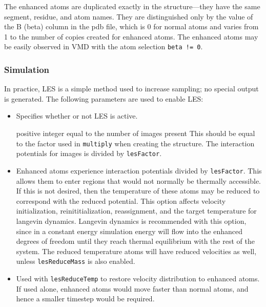The enhanced atoms are duplicated exactly in the structure---they have
the same segment, residue, and atom names.  They are distinguished only
by the value of the B (beta) column in the pdb file, which is 0 for
normal atoms and varies from 1 to the number of copies created for
enhanced atoms.  The enhanced atoms may be easily observed in VMD with
the atom selection \verb#beta != 0#.

\subsubsection{Simulation}

In practice, LES is a simple method used to increase sampling;
no special output is generated.
The following parameters are used to enable LES:

\begin{itemize}

\item
{}
{Specifies whether or not LES is active.}

{positive integer equal to the number of images present}
{This should be equal to the factor used in {\tt multiply}
 when creating the structure.  The interaction potentials for images is
 divided by {\tt lesFactor}.  
}

\item
{}
{Enhanced atoms experience interaction potentials divided by {\tt lesFactor}.
This allows them to enter regions that would not normally be thermally
accessible.  If this is not desired, then the temperature of these atoms
may be reduced to correspond with the reduced potential.  This option
affects velocity initialization, reinititialization, reassignment, and
the target temperature for langevin dynamics.  Langevin dynamics is
recommended with this option, since in a constant energy simulation energy
will flow into the enhanced degrees of freedom until they reach thermal
equilibrium with the rest of the system.  The reduced temperature atoms
will have reduced velocities as well, unless {\tt lesReduceMass} is also
enabled.}

\item
{}
{Used with {\tt lesReduceTemp} to restore velocity distribution to
enhanced atoms.  If used alone, enhanced atoms would move faster than
normal atoms, and hence a smaller timestep would be required.}


\end{itemize}
